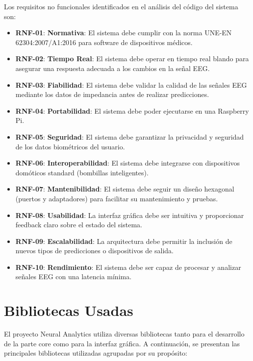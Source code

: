 Los requisitos no funcionales identificados en el análisis del código del sistema son:

\begin{itemize}
    \item \textbf{RNF-01}: \textbf{Normativa}: El sistema debe cumplir con la norma UNE-EN 62304:2007/A1:2016 para software de dispositivos médicos.\label{rnf-01}
    \item \textbf{RNF-02}: \textbf{Tiempo Real}: El sistema debe operar en tiempo real blando para asegurar una respuesta adecuada a los cambios en la señal EEG.\label{rnf-02}
    \item \textbf{RNF-03}: \textbf{Fiabilidad}: El sistema debe validar la calidad de las señales EEG mediante los datos de impedancia antes de realizar predicciones.\label{rnf-03}
    \item \textbf{RNF-04}: \textbf{Portabilidad}: El sistema debe poder ejecutarse en una Raspberry Pi.\label{rnf-04}
    \item \textbf{RNF-05}: \textbf{Seguridad}: El sistema debe garantizar la privacidad y seguridad de los datos biométricos del usuario.\label{rnf-05}
    \item \textbf{RNF-06}: \textbf{Interoperabilidad}: El sistema debe integrarse con dispositivos domóticos standard (bombillas inteligentes).\label{rnf-06}
    \item \textbf{RNF-07}: \textbf{Mantenibilidad}: El sistema debe seguir un diseño hexagonal (puertos y adaptadores) para facilitar su mantenimiento y pruebas.\label{rnf-07}
    \item \textbf{RNF-08}: \textbf{Usabilidad}: La interfaz gráfica debe ser intuitiva y proporcionar feedback claro sobre el estado del sistema.\label{rnf-08}
    \item \textbf{RNF-09}: \textbf{Escalabilidad}: La arquitectura debe permitir la inclusión de nuevos tipos de predicciones o dispositivos de salida.\label{rnf-09}
    \item \textbf{RNF-10}: \textbf{Rendimiento}: El sistema debe ser capaz de procesar y analizar señales EEG con una latencia mínima.\label{rnf-10}
\end{itemize}

\newpage

\section{Bibliotecas Usadas}

El proyecto Neural Analytics utiliza diversas bibliotecas tanto para el desarrollo de la parte core como para la interfaz gráfica. A continuación, se presentan las principales bibliotecas utilizadas agrupadas por su propósito:

